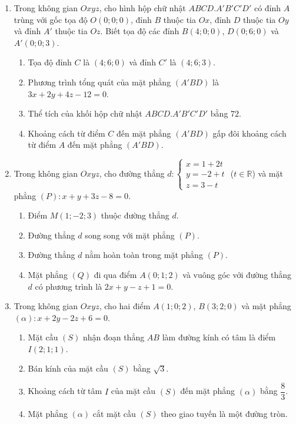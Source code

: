 \documentclass[12pt,a4paper]{article}
\begin{document}
\begin{enumerate}
\needspace{6.5cm}
\item Trong không gian $Oxyz$, cho hình hộp chữ nhật $ABCD.A'B'C'D'$ có đỉnh $A$ trùng với gốc tọa độ $O(0; 0; 0)$, đỉnh $B$ thuộc tia $Ox$, đỉnh $D$ thuộc tia $Oy$ và đỉnh $A'$ thuộc tia $Oz$. Biết tọa độ các đỉnh $B(4; 0; 0)$, $D(0; 6; 0)$ và $A'(0; 0; 3)$.
\begin{enumerate}[label=\alph*),leftmargin=*,itemsep=3pt]
    \item Tọa độ đỉnh $C$ là $(4; 6; 0)$ và đỉnh $C'$ là $(4; 6; 3)$.
    \item Phương trình tổng quát của mặt phẳng $(A'BD)$ là $3x + 2y + 4z - 12 = 0$.
    \item Thể tích của khối hộp chữ nhật $ABCD.A'B'C'D'$ bằng $72$.
    \item Khoảng cách từ điểm $C$ đến mặt phẳng $(A'BD)$ gấp đôi khoảng cách từ điểm $A$ đến mặt phẳng $(A'BD)$.
\end{enumerate}

\needspace{6.5cm}
\item Trong không gian $Oxyz$, cho đường thẳng $d: \begin{cases} x = 1 + 2t \\ y = -2 + t \\ z = 3 - t \end{cases}$ ($t \in \mathbb{R}$) và mặt phẳng $(P): x + y + 3z - 8 = 0$.
\begin{enumerate}[label=\alph*),leftmargin=*,itemsep=3pt]
    \item Điểm $M(1; -2; 3)$ thuộc đường thẳng $d$.
    \item Đường thẳng $d$ song song với mặt phẳng $(P)$.
    \item Đường thẳng $d$ nằm hoàn toàn trong mặt phẳng $(P)$.
    \item Mặt phẳng $(Q)$ đi qua điểm $A(0; 1; 2)$ và vuông góc với đường thẳng $d$ có phương trình là $2x + y - z + 1 = 0$.
\end{enumerate}

\needspace{6.5cm}
\item Trong không gian $Oxyz$, cho hai điểm $A(1; 0; 2)$, $B(3; 2; 0)$ và mặt phẳng $(\alpha): x + 2y - 2z + 6 = 0$.
\begin{enumerate}[label=\alph*),leftmargin=*,itemsep=3pt]
    \item Mặt cầu $(S)$ nhận đoạn thẳng $AB$ làm đường kính có tâm là điểm $I(2; 1; 1)$.
    \item Bán kính của mặt cầu $(S)$ bằng $\sqrt{3}$.
    \item Khoảng cách từ tâm $I$ của mặt cầu $(S)$ đến mặt phẳng $(\alpha)$ bằng $\dfrac{8}{3}$.
    \item Mặt phẳng $(\alpha)$ cắt mặt cầu $(S)$ theo giao tuyến là một đường tròn.
\end{enumerate}


\end{enumerate}
\end{document}
